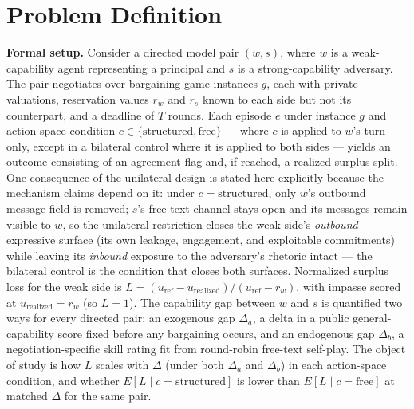 \documentclass[11pt]{article}
\begin{document}
\section{Problem Definition}

\noindent\textbf{Formal setup.} Consider a directed model pair $(w,s)$, where $w$ is a weak-capability agent representing a principal and $s$ is a strong-capability adversary. The pair negotiates over bargaining game instances $g$, each with private valuations, reservation values $r_w$ and $r_s$ known to each side but not its counterpart, and a deadline of $T$ rounds. Each episode $e$ under instance $g$ and action-space condition $c \in \{\text{structured}, \text{free}\}$ --- where $c$ is applied to $w$'s turn only, except in a bilateral control where it is applied to both sides --- yields an outcome consisting of an agreement flag and, if reached, a realized surplus split. One consequence of the unilateral design is stated here explicitly because the mechanism claims depend on it: under $c=\text{structured}$, only $w$'s outbound message field is removed; $s$'s free-text channel stays open and its messages remain visible to $w$, so the unilateral restriction closes the weak side's \emph{outbound} expressive surface (its own leakage, engagement, and exploitable commitments) while leaving its \emph{inbound} exposure to the adversary's rhetoric intact --- the bilateral control is the condition that closes both surfaces. Normalized surplus loss for the weak side is $L = (u_{\mathrm{ref}} - u_{\mathrm{realized}}) / (u_{\mathrm{ref}} - r_w)$, with impasse scored at $u_{\mathrm{realized}} = r_w$ (so $L = 1$). The capability gap between $w$ and $s$ is quantified two ways for every directed pair: an exogenous gap $\Delta_a$, a delta in a public general-capability score fixed before any bargaining occurs, and an endogenous gap $\Delta_b$, a negotiation-specific skill rating fit from round-robin free-text self-play. The object of study is how $L$ scales with $\Delta$ (under both $\Delta_a$ and $\Delta_b$) in each action-space condition, and whether $E[L \mid c=\text{structured}]$ is lower than $E[L \mid c=\text{free}]$ at matched $\Delta$ for the same pair.
\end{document}
